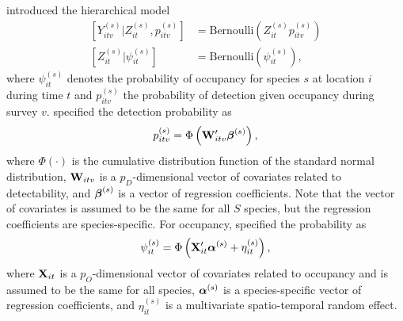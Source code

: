 \citet{royle2008hierarchical} introduced the hierarchical model 
\begin{equation} \label{eq:hierarchical}
\begin{aligned}
\left[ Y_{itv}^{(s)} | Z_{it}^{(s)}, p_{itv}^{(s)} \right] &= \text{Bernoulli}\left(Z_{it}^{(s)}p_{itv}^{(s)}\right) \\
\left[ Z_{it}^{(s)} | \psi_{it}^{(s)} \right] &= \text{Bernoulli} \left( \psi_{it}^{(s)} \right),
\end{aligned}
\end{equation}
where $\psi_{it}^{(s)}$ denotes the probability of occupancy for species $s$ at location $i$ during time $t$ and $p_{itv}^{(s)}$ the probability of detection given occupancy during survey $v$. \citet{hepler2021spatiotemporal} specified the detection probability as 
\begin{equation} \label{eq:detectionprobability} p_{itv}^{(s)} = \Phi \left( {\bf W}_{itv}' \mbox{\boldmath $\beta$}^{(s)} \right), \end{equation} where $\Phi(\cdot)$ is the cumulative distribution function of the standard normal distribution, ${\bf W}_{itv}$ is a $p_D$-dimensional vector of covariates related to detectability, and $\mbox{\boldmath $\beta$}^{(s)}$ is a vector of regression coefficients. Note that the vector of covariates is assumed to be the same for all $S$ species, but the regression coefficients are species-specific. For occupancy, \citet{hepler2021spatiotemporal} specified the probability as 
\begin{equation}
\label{eq:occupancyprobability} 
\psi_{it}^{(s)} = \Phi \left( {\bf X}_{it}' \mbox{\boldmath $\alpha$}^{(s)} + \eta_{it}^{(s)} \right), 
\end{equation}
where ${\bf X}_{it}$ is a $p_{O}$-dimensional vector of covariates related to occupancy and is assumed to be the same for all species, $\mbox{\boldmath $\alpha$}^{(s)}$ is a species-specific vector of regression coefficients, and $\eta_{it}^{(s)}$ is a multivariate spatio-temporal random effect. 

